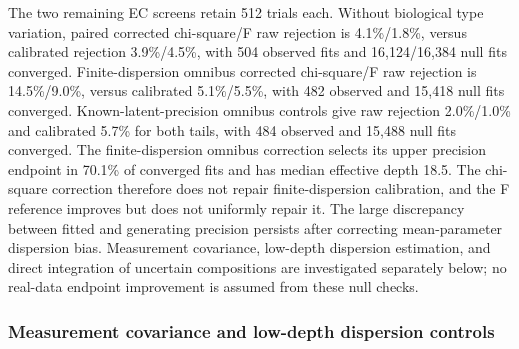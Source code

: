 \documentclass[11pt]{article}
\begin{document}
The two remaining EC screens retain 512 trials each. Without biological type variation, paired corrected chi-square/F raw rejection is 4.1\%/1.8\%, versus calibrated rejection 3.9\%/4.5\%, with 504 observed fits and 16,124/16,384 null fits converged. Finite-dispersion omnibus corrected chi-square/F raw rejection is 14.5\%/9.0\%, versus calibrated 5.1\%/5.5\%, with 482 observed and 15,418 null fits converged. Known-latent-precision omnibus controls give raw rejection 2.0\%/1.0\% and calibrated 5.7\% for both tails, with 484 observed and 15,488 null fits converged. The finite-dispersion omnibus correction selects its upper precision endpoint in 70.1\% of converged fits and has median effective depth 18.5. The chi-square correction therefore does not repair finite-dispersion calibration, and the F reference improves but does not uniformly repair it. The large discrepancy between fitted and generating precision persists after correcting mean-parameter dispersion bias. Measurement covariance, low-depth dispersion estimation, and direct integration of uncertain compositions are investigated separately below; no real-data endpoint improvement is assumed from these null checks.

\subsubsection*{Measurement covariance and low-depth dispersion controls}
\end{document}
